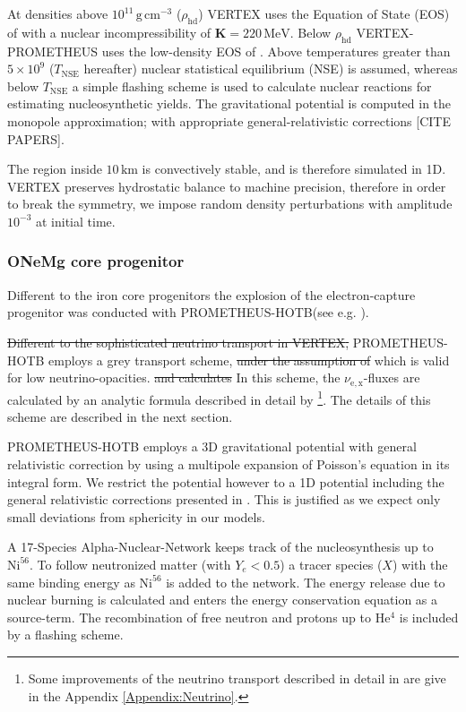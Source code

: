 \documentclass[fleqn,usenatbib]{mnras}
\newcommand{\helium}{$\mathrm{He^{4}}$\xspace}
\newcommand{\gcc}{\text{g}\, \text{cm}^{-3}}
\newcommand{\prom}{\textsc{P{\footnotesize ROMETHEUS}-H{\footnotesize OT}B}\xspace}
\newcommand{\vertexprom}{\textsc{V{\footnotesize ERTEX}-P{\footnotesize ROMETHEUS}}\xspace}
\newcommand{\vertex}{\textsc{V{\footnotesize ERTEX}}\xspace}
\newcommand{\NY}[2]{{\color{blue}\sout{#1}#2}}
\newcommand{\COM}[1]{{\color{red}#1}}
\begin{document}
At densities above $10^{11}\,\gcc$ ($\rho_{\text{hd}}$) \vertex uses  the Equation of State (EOS) of \cite{Lattimer1991} with a nuclear incompressibility of $\mathbf{K}=220\, \text{MeV}$. Below $\rho_{\text{hd}}$ \vertexprom uses the low-density EOS of \cite{Janka1999}. Above  temperatures greater than $5\times10^{9}$ ($T_{\text{NSE}}$ hereafter) nuclear statistical equilibrium (NSE) is assumed, whereas below $T_{\text{NSE}}$ a simple flashing scheme is used to calculate nuclear reactions for estimating nucleosynthetic yields. The gravitational potential is computed in the monopole approximation; with appropriate general-relativistic corrections \COM{[CITE PAPERS]}.

The region inside $10\,\text{km}$ is  convectively stable, and is therefore simulated in 1D. \vertex preserves hydrostatic balance to machine precision, therefore in order to break the symmetry\NY{}{,} we impose random density perturbations with amplitude $10^{-3}$ at initial time. 
\subsubsection{ONeMg core progenitor}
Different to the iron core progenitors the explosion of the electron-capture progenitor was conducted with \prom (see e.g. \citet{Wongwathanarat2012,Wongwathanarat2013}).

\NY{Different to the sophisticated neutrino transport in \vertex,}{} \prom employs a grey transport scheme\NY{}{,} \NY{under the assumption of}{ which is valid for} low neutrino-opacities\NY{}{.} \NY{and calculates}{ In this scheme,} the $\nu_{\mathrm{e,x}}$-fluxes \NY{}{are calculated} by an analytic formula described in detail by \cite{Scheck2006}\footnote{Some improvements of the neutrino transport described in detail in \cite{Scheck2006} are give in the Appendix \ref{Appendix:Neutrino}.}. The details of this scheme are described in the next section.

\prom employs a 3D gravitational potential with general relativistic correction by using a multipole expansion of Poisson's equation in its integral form. We restrict the potential however to a 1D potential including the general relativistic corrections presented in \citep{Marek2006}. This is justified as we expect only small deviations from sphericity in our models.

A 17-Species Alpha-Nuclear-Network keeps track of the nucleosynthesis up to $\mathrm{Ni}^{56}$. To follow neutronized matter (with $Y_e < 0.5 $) a tracer species ($X$) with the same binding energy as $\mathrm{Ni}^{56}$ is added to the network. The energy release due to nuclear burning is calculated and enters the energy conservation equation as a source-term. 
The recombination of free neutron and protons up to \helium is included by a flashing scheme.
\end{document}
